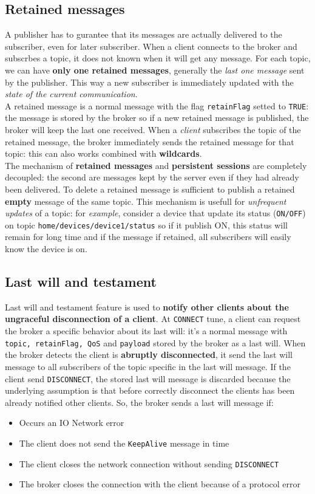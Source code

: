 \documentclass[10pt,a4paper]{report}
\theoremstyle{definition}
\begin{document}
\subsection{Retained messages}\label{sec:retained-messages}
A publisher has to gurantee that its messages are actually delivered to the subscriber, even for later subscriber. When a client connects to the broker and subscrbes a topic, it does not known when it will get any message. For each topic, we can have \textbf{only one retained messages}, generally the \textit{last one message} sent by the publisher. This way a new subscriber is immediately updated with the \textit{state of the current communication}.\\
A retained message is a normal message with the flag \texttt{retainFlag} setted to \texttt{TRUE}: the message is stored by the broker so if a new retained message is published, the broker will keep the last one received.
When a \textit{client} subscribes the topic of the retained message, the broker immediately sends the retained message for that topic: this can also works combined with \textbf{wildcards}.\\
The mechanism of \textbf{retained messages} and \textbf{persistent sessions} are completely decoupled: the second are messages kept by the server even if they had already been delivered. To delete a retained message is sufficient to publish a retained \textbf{empty} message of the same topic. This mechanism is usefull for \textit{unfrequent updates} of a topic: for \textit{example}, consider a device that update its status (\texttt{ON/OFF}) on topic \texttt{home/devices/device1/status} so if it publish ON, this status will remain for long time and if the message if retained, all subscribers will easily know the device is on.
\subsection{Last will and testament}\label{sec:last-will-and-testament}
Last will and testament feature is used to \textbf{notify other clients about the ungraceful disconnection of a client}. At \texttt{CONNECT} tune, a client can request the broker a specific behavior about its last will: it's a normal message with \texttt{topic, retainFlag, QoS} and \texttt{payload} stored by the broker as a last will.
When the broker detects the client is \textbf{abruptly disconnected}, it send the last will message to all subscribers of the topic specific in the last will message. If the client send \texttt{DISCONNECT}, the stored last will message is discarded because the underlying assumption is that before correctly disconnect the clients has been already notified other clients.
So, the broker sends a last will message if:
\begin{itemize}
	\item 
	Occurs an IO Network error
	\item 
	The client does not send the \texttt{KeepAlive} message in time
	\item 
	The client closes the network connection without sending \texttt{DISCONNECT}
	\item 
	The broker closes the connection with the client because of a protocol error
\end{itemize}
\end{document}

